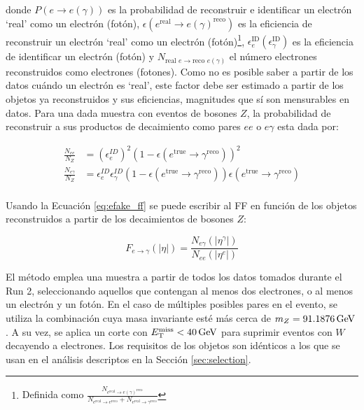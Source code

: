 \noindent
donde $P(e\to e(\gamma))$ es la probabilidad de reconstruir e identificar un electrón `real' como un electrón (fotón), $\epsilon(e^{\text{real}}\to e(\gamma)^{\text{reco}})$ es la eficiencia de reconstruir un electrón `real' como un electrón (fotón)\footnote{Definida como $\frac{N_{e^{\text{real}}\to e(\gamma)^{\text{reco}}}}{N_{e^{\text{real}}\to e^{\text{reco}}}+N_{e^{\text{real}}\to \gamma^{\text{reco}}}}$}, $\epsilon^{\text{ID}}_{e} (\epsilon^{\text{ID}}_{\gamma})$ es la eficiencia de identificar un electrón (fotón) y $N_{\text{real } e\to \text{reco } e(\gamma)}$ el número electrones reconstruidos como electrones (fotones). Como no es posible saber a partir de los datos cuándo un electrón es `real', este factor debe ser estimado a partir de los objetos ya reconstruidos y sus eficiencias, magnitudes que sí son mensurables en datos. Para una dada muestra con eventos de bosones $Z$, la probabilidad de reconstruir a sus productos de decaimiento como pares $ee$ o $e\gamma$ esta dada por:

\begin{equation}
\begin{split}
\frac{N_{ee}}{N_Z} & = (\epsilon^{ID}_{e})^{2} (1-\epsilon(e^{\text{true}}\to \gamma^{\text{reco}}))^{2} \\
\frac{N_{e\gamma}}{N_Z} & = \epsilon^{ID}_{e}\epsilon^{ID}_{\gamma} (1-\epsilon(e^{\text{true}}\to \gamma^{\text{reco}}))\epsilon(e^{\text{true}}\to \gamma^{\text{reco}}) \\
\end{split}
\end{equation}


Usando la Ecuación \ref{eq:efake_ff} se puede escribir al FF en función de los objetos reconstruidos a partir de los decaimientos de bosones $Z$:

\begin{equation}
  F_{e\to \gamma}(|\eta|) = \frac{N_{e\gamma}(|\eta^{\gamma}|)}{N_{ee}(|\eta^{e}|)}
\end{equation}


El método emplea una muestra a partir de todos los datos tomados durante el Run 2, seleccionando aquellos que contengan al menos dos electrones, o al menos un electrón y un fotón. En el caso de múltiples posibles pares en el evento, se utiliza la combinación cuya masa invariante esté más cerca de $m_Z=91.1876\,\text{GeV}$ \cite{z_pdg}. A su vez, se aplica un corte con $E_{\text{T}}^{\text{miss}}<40\,\text{GeV}$ para suprimir eventos con $W$ decayendo a electrones. Los requisitos de los objetos son idénticos a los que se usan en el análisis descriptos en la Sección \ref{sec:selection}.

